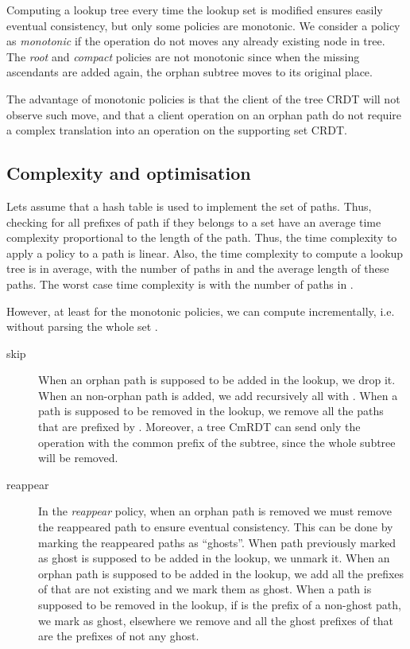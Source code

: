 \documentclass[a4paper]{article}
\begin{document}
Computing a lookup tree  every time the lookup set  is
modified ensures easily eventual consistency, but only some policies
are monotonic. We consider a policy as {\em monotonic} if the 
operation do not moves any already existing node in tree. The {\em
  root} and {\em compact} policies are not monotonic since when the
missing ascendants are added again, the orphan subtree moves to its
original place.

The advantage of monotonic policies is that the client of the tree
CRDT will not observe such move, and that a client operation on an
orphan path do not require a complex translation into an operation on
the supporting set CRDT.

\subsection{Complexity and optimisation}

Lets assume that a hash table is used to implement the set of
paths. Thus, checking for all prefixes of path if they belongs to a set
have an average time complexity proportional to the length of the
path. Thus, the time complexity to apply a policy to a path is linear.
Also, the time complexity to compute a lookup tree is  in
average, with  the number of paths in  and  the average
length of these paths. The worst case time complexity is 
with  the number of paths in .

However, at least for the monotonic policies, we can compute 
incrementally, i.e. without parsing the whole set .

\begin{description}
\item[skip] When an orphan path is supposed to be added in the lookup,
  we drop it. When an non-orphan path  is added, we add recursively
  all  with . When a path  is supposed to be
  removed in the lookup, we remove all the paths that are prefixed by
  . Moreover, a tree CmRDT can send only the operation 
  with  the common prefix of the subtree, since the whole subtree
  will be removed.
\item[reappear] In the {\em reappear} policy, when an orphan path is
  removed we must remove the reappeared path to ensure eventual
  consistency.  This can be done by marking the reappeared paths as
  ``ghosts''.  When path previously marked as ghost is supposed to be
  added in the lookup, we unmark it. When an orphan path  is
  supposed to be added in the lookup, we add all the prefixes of 
  that are not existing and we mark them as ghost. When a path  is
  supposed to be removed in the lookup, if  is the prefix of a
  non-ghost path, we mark  as ghost, elsewhere we remove  and
  all the ghost prefixes of  that are the prefixes of not any ghost.
\end{description}
\end{document}
